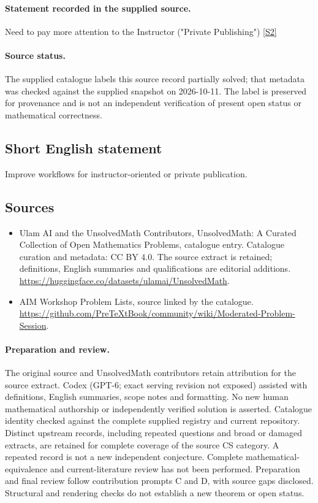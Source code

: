\documentclass[11pt]{article}
\begin{document}
\paragraph{Statement recorded in the supplied source.}
Need to pay more attention to the Instructor ("Private Publishing") \href{https://github.com/PreTeXtBook/community/wiki/Moderated-Problem-Session}{[S2]}
\paragraph{Source status.}
The supplied catalogue labels this source record partially solved; that metadata was checked against the supplied snapshot on 2026-10-11. The label is preserved for provenance and is not an independent verification of present open status or mathematical correctness.
\subsection{Short English statement}
Improve workflows for instructor-oriented or private publication.
\subsection{Sources}
\begin{itemize}
\item[S1] Ulam AI and the UnsolvedMath Contributors, UnsolvedMath: A Curated Collection of Open Mathematics Problems, catalogue entry. Catalogue curation and metadata: CC BY 4.0. The source extract is retained; definitions, English summaries and qualifications are editorial additions.
\url{https://huggingface.co/datasets/ulamai/UnsolvedMath}.
\item[S2] AIM Workshop Problem Lists, source linked by the catalogue.
\url{https://github.com/PreTeXtBook/community/wiki/Moderated-Problem-Session}.
\end{itemize}
\paragraph{Preparation and review.}
The original source and UnsolvedMath contributors retain attribution for the source extract. Codex (GPT-6; exact serving revision not exposed) assisted with definitions, English summaries, scope notes and formatting. No new human mathematical authorship or independently verified solution is asserted. Catalogue identity checked against the complete supplied registry and current repository. Distinct upstream records, including repeated questions and broad or damaged extracts, are retained for complete coverage of the source CS category. A repeated record is not a new independent conjecture. Complete mathematical-equivalence and current-literature review has not been performed. Preparation and final review follow contribution prompts C and D, with source gaps disclosed. Structural and rendering checks do not establish a new theorem or open status.
\label{end:statement}
\end{document}
